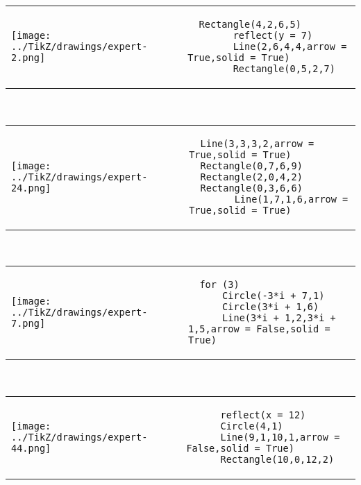         \begin{tabular}{ll}
\texttt{[image: ../TikZ/drawings/expert-2.png]}&
        \begin{minipage}{10cm}
        \begin{verbatim}
  Rectangle(4,2,6,5)
        reflect(y = 7)
        Line(2,6,4,4,arrow = True,solid = True)
        Rectangle(0,5,2,7)
        \end{verbatim}
\end{minipage}
\end{tabular}        
        \\

        \begin{tabular}{ll}
\texttt{[image: ../TikZ/drawings/expert-24.png]}&
        \begin{minipage}{10cm}
        \begin{verbatim}
  Line(3,3,3,2,arrow = True,solid = True)
  Rectangle(0,7,6,9)
  Rectangle(2,0,4,2)
  Rectangle(0,3,6,6)
        Line(1,7,1,6,arrow = True,solid = True)
        \end{verbatim}
\end{minipage}
\end{tabular}        
        \\

        \begin{tabular}{ll}
\texttt{[image: ../TikZ/drawings/expert-7.png]}&
        \begin{minipage}{10cm}
        \begin{verbatim}
  for (3)
      Circle(-3*i + 7,1)
      Circle(3*i + 1,6)
      Line(3*i + 1,2,3*i + 1,5,arrow = False,solid = True)
        \end{verbatim}
\end{minipage}
\end{tabular}        
        \\

        \begin{tabular}{ll}
\texttt{[image: ../TikZ/drawings/expert-44.png]}&
        \begin{minipage}{10cm}
        \begin{verbatim}
      reflect(x = 12)
      Circle(4,1)
      Line(9,1,10,1,arrow = False,solid = True)
      Rectangle(10,0,12,2)
        \end{verbatim}
\end{minipage}
\end{tabular}        
        \\

